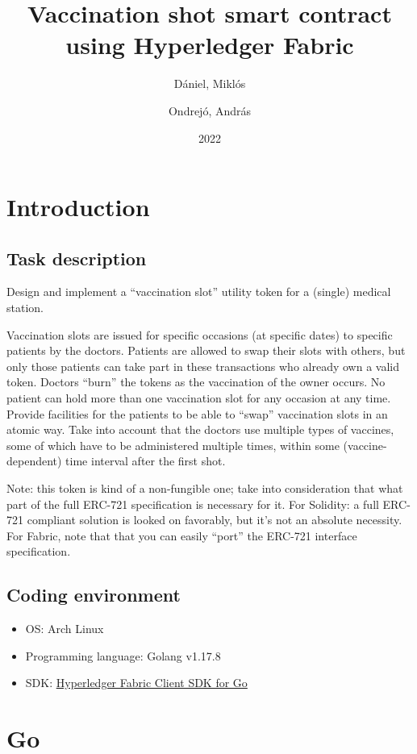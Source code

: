 \documentclass{article}
\author{
  Dániel, Miklós\\
  \IfFileExists{DM.txt}{
    \texttt{
        \begingroup
            \obeylines
            
        \endgroup
            }
  }{}  
  \and
  Ondrejó, András\\
  \IfFileExists{OA.txt}{
    \texttt{
        \begingroup
            \obeylines
            
        \endgroup
            }
  }{}  
}
\title{Vaccination shot smart contract using Hyperledger Fabric}
\date{2022}
\begin{document}
\maketitle
\newpage
\tableofcontents
\newpage
\section{Introduction}
\subsection{Task description}
Design and implement a “vaccination slot” utility token for a (single) medical station.\par
Vaccination slots are issued for specific occasions (at specific dates) to specific patients by the doctors. Patients are allowed to swap their slots with others, but only those patients can take part in these transactions who already own a valid token. Doctors “burn” the tokens as the vaccination of the owner occurs. No patient can hold more than one vaccination slot for any occasion at any time. Provide facilities for the patients to be able to “swap” vaccination slots in an atomic way. Take into account that the doctors use multiple types of vaccines, some of which have to be administered multiple times, within some (vaccine-dependent) time interval after the first shot.\par
Note: this token is kind of a non-fungible one; take into consideration that what part of the full ERC-721 specification is necessary for it. For Solidity: a full ERC-721 compliant solution is looked on favorably, but it's not an absolute necessity. For Fabric, note that that you can easily “port” the ERC-721 interface specification.

\subsection{Coding environment}
\begin{itemize}
  \item OS: Arch Linux
  \item Programming language: Golang v1.17.8
  \item SDK: \href{https://github.com/hyperledger/fabric-sdk-go}{Hyperledger Fabric Client SDK for Go}
\end{itemize}

\section{Go}
\end{document}
